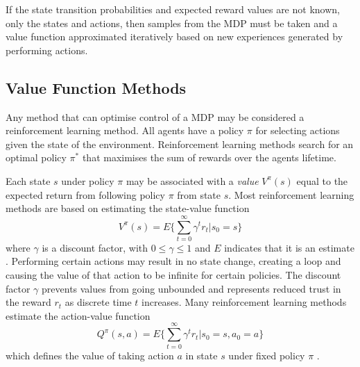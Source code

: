 If the state transition probabilities and expected reward values are not known,
only the states and actions, then samples from the MDP must be taken and a value
function approximated iteratively based on new experiences generated by
performing actions.

\subsection{Value Function Methods}
\label{sec:valuebased}
Any method that can optimise control of a MDP may be considered a reinforcement
learning method.  All agents have a policy $\pi$ for selecting actions given the
state of the environment. Reinforcement learning methods search for an optimal
policy $\pi^*$ that maximises the sum of rewards over the agents lifetime.

Each state $s$ under policy $\pi$ may be associated with a \textit{value}
$V^\pi(s)$ equal to the expected return from following policy $\pi$ from state
$s$.  Most reinforcement learning methods are based on estimating the
state-value function
\begin{equation}
\label{eq:statevalue}
V^\pi(s) = E \Bigg\lbrace \sum^\infty_{t=0} \gamma^t r_t \Bigg\vert s_0 = s
\Bigg\rbrace
\end{equation}
where $\gamma$ is a discount factor, with $0\leq \gamma \leq 1$ and $E$
indicates that it is an estimate \cite{suttonbarto:1998}. Performing certain
actions may result in no state change, creating a loop and causing the value of
that action to be infinite for certain policies. The discount factor $\gamma$
prevents values from going unbounded and represents reduced trust in the reward
$r_t$ as discrete time $t$ increases.  Many reinforcement learning methods
estimate the action-value function
\begin{equation}
\label{eq:actionvalue}
Q^\pi(s,a) = E \Bigg\lbrace \sum^\infty_{t=0} \gamma^t r_t \Bigg\vert s_0 = s,
a_0 = a \Bigg\rbrace
\end{equation}
which defines the value of taking action $a$ in state $s$ under fixed policy
$\pi$ \cite{suttonbarto:1998}.

